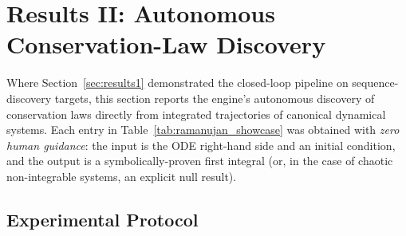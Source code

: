 %
%

\section{Results II: Autonomous Conservation-Law Discovery}
\label{sec:results2}

Where Section~\ref{sec:results1} demonstrated the closed-loop pipeline on
sequence-discovery targets, this section reports the engine's autonomous
discovery of conservation laws directly from integrated trajectories of
canonical dynamical systems. Each entry in Table~\ref{tab:ramanujan_showcase} was
obtained with \textit{zero human guidance}: the input is the ODE right-hand
side and an initial condition, and the output is a symbolically-proven
first integral (or, in the case of chaotic non-integrable systems, an
explicit null result).

\subsection{Experimental Protocol}

